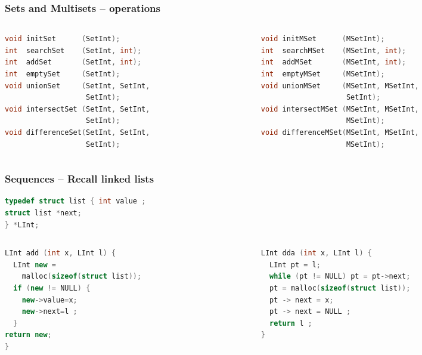 \documentclass[aspectratio=169]{beamer}
\begin{document}
\begin{frame}[fragile]\frametitle{Sets and Multisets -- operations}
\centering

\begin{columns}
\begin{column}{.48\textwidth}
\begin{lstlisting}[language=C++,emph={MSetInt,SetInt}]
void initSet      (SetInt);
int  searchSet    (SetInt, int);
int  addSet       (SetInt, int);
int  emptySet     (SetInt);
void unionSet     (SetInt, SetInt,
                   SetInt);
void intersectSet (SetInt, SetInt,
                   SetInt);
void differenceSet(SetInt, SetInt,
                   SetInt);
\end{lstlisting}
%
\end{column}
\begin{column}{.50\textwidth}
%
\begin{lstlisting}[language=C++,emph={MSetInt,SetInt}]
void initMSet      (MSetInt); 
int  searchMSet    (MSetInt, int);
int  addMSet       (MSetInt, int);
int  emptyMSet     (MSetInt);
void unionMSet     (MSetInt, MSetInt,
                    SetInt);
void intersectMSet (MSetInt, MSetInt,
                    MSetInt); 
void differenceMSet(MSetInt, MSetInt,
                    MSetInt);
\end{lstlisting}
%
\end{column}
\end{columns}

\end{frame}

\begin{frame}[fragile]\frametitle{Sequences -- Recall linked lists}
  
\begin{lstlisting}[language=C++,emph={list,LInt}]
typedef struct list { int value ;
struct list *next;
} *LInt;
\end{lstlisting}

\begin{columns}
\begin{column}{.48\textwidth}
\begin{lstlisting}[language=C++, emph={prev,LInt}]
LInt add (int x, LInt l) {
  LInt new =
    malloc(sizeof(struct list));
  if (new != NULL) {
    new->value=x;
    new->next=l ;
  }
return new;
}
\end{lstlisting}
%
\end{column}
\begin{column}{.50\textwidth}
%
\begin{lstlisting}[language=C++, emph={prev,LInt}]
LInt dda (int x, LInt l) {
  LInt pt = l;
  while (pt != NULL) pt = pt->next;
  pt = malloc(sizeof(struct list));
  pt -> next = x;
  pt -> next = NULL ;
  return l ;
}
\end{lstlisting}
%
\end{column}
\end{columns}
\end{frame}
\end{document}
